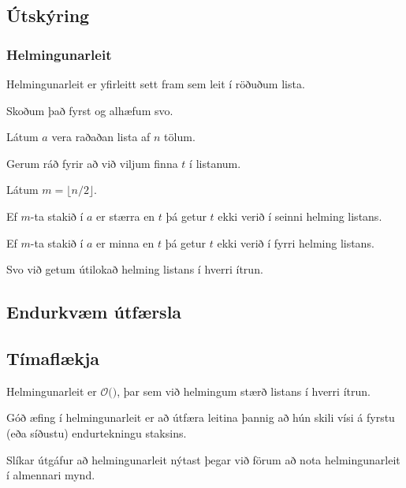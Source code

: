\subsection{Útskýring}
{
    \frametitle{Helmingunarleit}
    {
        \item<1-> Helmingunarleit er yfirleitt sett fram sem leit í röðuðum lista.
        \item<2-> Skoðum það fyrst og alhæfum svo.
        \item<3-> Látum $a$ vera raðaðan lista af $n$ tölum.
        \item<4-> Gerum ráð fyrir að við viljum finna $t$ í listanum.
        \item<5-> Látum $m = \lfloor n/2 \rfloor$.
        \item<6-> Ef $m$-ta stakið í $a$ er stærra en $t$ þá getur $t$ ekki verið í seinni helming listans.
        \item<7-> Ef $m$-ta stakið í $a$ er minna en $t$ þá getur $t$ ekki verið í fyrri helming listans.
        \item<8-> Svo við getum útilokað helming listans í hverri ítrun.
    }
}

\subsection{Endurkvæm útfærsla}
{
}

\subsection{Tímaflækja}
{
    {
        \item<1-> Helmingunarleit er $\mathcal{O}($$)$, þar sem við helmingum stærð listans í hverri ítrun.
        \item<3-> Góð æfing í helmingunarleit er að útfæra leitina þannig að hún skili vísi á fyrstu (eða síðustu)  endurtekningu staksins.
        \item<4-> Slíkar útgáfur að helmingunarleit nýtast þegar við förum að nota helmingunarleit í almennari mynd.
    }
}

